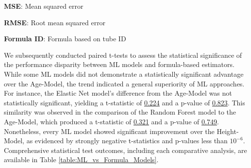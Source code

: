 \documentclass[11pt]{article}
\begin{document}
\begin{table}[h]
\caption{Formula based models performance comparison.}
\label{table:Formula_Model_Performance}
\begin{threeparttable}
\renewcommand{\TPTminimum}{\linewidth}
\begin{tablenotes}
\footnotesize
\item \textbf{MSE}: Mean squared error
\item \textbf{RMSE}: Root mean squared error
\item \textbf{Formula ID}: Formula based on tube ID
\end{tablenotes}
\end{threeparttable}
\end{table}

We subsequently conducted paired t-tests to assess the statistical significance of the performance disparity between ML models and formula-based estimators. While some ML models did not demonstrate a statistically significant advantage over the Age-Model, the trend indicated a general superiority of ML approaches. For instance, the Elastic Net model's difference from the Age-Model was not statistically significant, yielding a t-statistic of \hyperlink{C4b}{0.224} and a p-value of \hyperlink{C4c}{0.823}. This similarity was observed in the comparison of the Random Forest model to the Age-Model, which produced a t-statistic of \hyperlink{C1b}{0.321} and a p-value of \hyperlink{C1c}{0.749}. Nonetheless, every ML model showed significant improvement over the Height-Model, as evidenced by strongly negative t-statistics and p-values less than \hyperlink{C0c}{$10^{-6}$}. Comprehensive statistical test outcomes, including each comparative analysis, are available in Table \ref{table:ML_vs_Formula_Models}.
\end{document}
